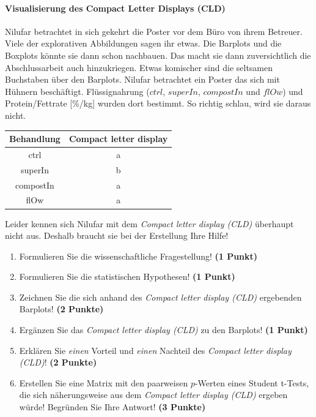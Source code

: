 \documentclass[a4paper, 9pt]{scrartcl}\usepackage[]{graphicx}\usepackage[]{xcolor}
\newenvironment{knitrout}{}{} %
\begin{document}
\paragraph{Visualisierung des Compact Letter Displays (CLD)}

Nilufar betrachtet in sich gekehrt die Poster vor dem Büro von ihrem Betreuer. Viele der explorativen Abbildungen sagen ihr etwas. Die Barplots und die Boxplots könnte sie dann schon nachbauen. Das macht sie dann zuversichtlich die Abschlussarbeit auch hinzukriegen. Etwas komischer sind die seltsamen Buchstaben über den Barplots. Nilufar betrachtet ein Poster das sich mit Hühnern beschäftigt. Flüssignahrung ($ctrl$, $superIn$, $compostIn$ und $flOw$) und Protein/Fettrate [\%/kg] wurden dort bestimmt. So richtig schlau, wird sie daraus nicht.

\begin{knitrout}
\color{fgcolor}\begin{table}[!h]
\centering\begingroup\fontsize{10}{12}\selectfont

\begin{tabular}{cc}
\toprule
\textbf{Behandlung} & \textbf{Compact letter display}\\
\midrule
ctrl & a\\
superIn & b\\
compostIn & a\\
flOw & a\\
\bottomrule
\end{tabular}
\endgroup{}
\end{table}

\end{knitrout}

Leider kennen sich Nilufar mit dem \textit{Compact letter display (CLD)} überhaupt nicht aus. Deshalb braucht sie bei der Erstellung Ihre Hilfe!

\begin{enumerate}
  \item Formulieren Sie die wissenschaftliche Fragestellung! \textbf{(1 Punkt)}
  \item Formulieren Sie die statistischen Hypothesen! \textbf{(1 Punkt)}
\item Zeichnen Sie die sich anhand des \textit{Compact letter display (CLD)} ergebenden Barplots! \textbf{(2 Punkte)}
\item Ergänzen Sie das \textit{Compact letter display (CLD)} zu den Barplots! \textbf{(1 Punkt)}
\item Erklären Sie \textit{einen} Vorteil und \textit{einen} Nachteil des \textit{Compact letter display (CLD)}! \textbf{(2 Punkte)}
\item Erstellen Sie eine Matrix mit den paarweisen $p$-Werten eines Student t-Tests, die sich näherungsweise aus dem \textit{Compact letter display (CLD)} ergeben würde! Begründen Sie Ihre Antwort! \textbf{(3 Punkte)}
\end{enumerate}
\end{document}
